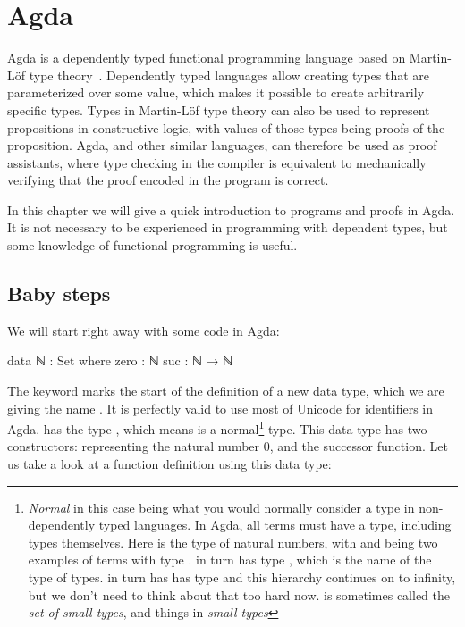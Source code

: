 
\chapter{Agda} \label{Agda}

	Agda is a dependently typed functional programming language based on
	Martin-Löf type theory~\cite{martin84}. Dependently typed languages allow
	creating types that are parameterized over some value, which makes it
	possible to create arbitrarily specific types. Types in Martin-Löf type
	theory can also be used to represent propositions in constructive logic,
	with values of those types being proofs of the proposition. Agda, and other
	similar languages, can therefore be used as proof assistants, where type
	checking in the compiler is equivalent to mechanically verifying that the
	proof encoded in the program is correct.

	In this chapter we will give a quick introduction to programs and proofs in
	Agda. It is not necessary to be experienced in programming with dependent
	types, but some knowledge of functional programming is useful.

	\section{Baby steps}

		We will start right away with some code in Agda:

		\begin{code}
			data ℕ : Set where
			  zero  :  ℕ
			  suc   :  ℕ → ℕ
		\end{code}

		The keyword  marks the start of the definition of a new
		data type, which we are giving the name . It is perfectly
		valid to use most of Unicode for identifiers in Agda.  has
		the type , which means  is a normal\footnote{
		\emph{Normal} in this case being what you would normally consider a
		type in non-dependently typed languages. In Agda, all terms must have a
		type, including types themselves. Here  is the type of
		natural numbers, with  and  being
		two examples of terms with type .  in turn has type
		, which is the name of the type of types.   in
		turn has has type  and this hierarchy continues on to
		infinity, but we don't need to think about that too hard now.
		 is sometimes called the \emph{set of small types}, and
		things in  \emph{small types}} type. This data type has two
		constructors:  representing the natural number $0$, and
		 the successor function. Let us take a look at a function
		definition using this data type:


